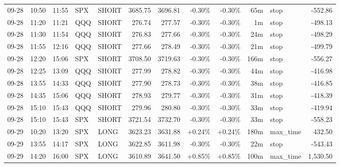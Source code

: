 \documentclass[11pt,a4paper,twoside]{article}
\begin{document}
\begin{center}
\begin{longtable}{>{\color{txtmain}}l l l l l r r r r r >{\color{txtmain}}l r}
09-28 & 10:50 & 11:55 & SPX & SHORT & 3685.75 & 3696.81 & \textcolor{lossred}{-0.30\%} & \textcolor{lossred}{-0.30\%} & 65m & stop & \textcolor{lossred}{-552.86} \\
09-28 & 11:20 & 11:21 & QQQ & SHORT & 276.74 & 277.57 & \textcolor{lossred}{-0.30\%} & \textcolor{lossred}{-0.30\%} & 1m & stop & \textcolor{lossred}{-498.13} \\
09-28 & 11:30 & 11:54 & QQQ & SHORT & 276.83 & 277.66 & \textcolor{lossred}{-0.30\%} & \textcolor{lossred}{-0.30\%} & 24m & stop & \textcolor{lossred}{-498.29} \\
09-28 & 11:55 & 12:16 & QQQ & SHORT & 277.66 & 278.49 & \textcolor{lossred}{-0.30\%} & \textcolor{lossred}{-0.30\%} & 21m & stop & \textcolor{lossred}{-499.79} \\
09-28 & 12:20 & 15:06 & SPX & SHORT & 3708.50 & 3719.63 & \textcolor{lossred}{-0.30\%} & \textcolor{lossred}{-0.30\%} & 166m & stop & \textcolor{lossred}{-556.27} \\
09-28 & 12:25 & 13:09 & QQQ & SHORT & 277.99 & 278.82 & \textcolor{lossred}{-0.30\%} & \textcolor{lossred}{-0.30\%} & 44m & stop & \textcolor{lossred}{-416.98} \\
09-28 & 13:55 & 14:33 & QQQ & SHORT & 277.90 & 278.73 & \textcolor{lossred}{-0.30\%} & \textcolor{lossred}{-0.30\%} & 38m & stop & \textcolor{lossred}{-416.85} \\
09-28 & 14:35 & 15:06 & QQQ & SHORT & 278.93 & 279.77 & \textcolor{lossred}{-0.30\%} & \textcolor{lossred}{-0.30\%} & 31m & stop & \textcolor{lossred}{-418.39} \\
09-28 & 15:10 & 15:43 & QQQ & SHORT & 279.96 & 280.80 & \textcolor{lossred}{-0.30\%} & \textcolor{lossred}{-0.30\%} & 33m & stop & \textcolor{lossred}{-419.94} \\
09-28 & 15:10 & 15:43 & SPX & SHORT & 3721.54 & 3732.70 & \textcolor{lossred}{-0.30\%} & \textcolor{lossred}{-0.30\%} & 33m & stop & \textcolor{lossred}{-558.23} \\
09-29 & 10:20 & 13:20 & SPX & LONG & 3623.23 & 3631.88 & \textcolor{wingreen}{+0.24\%} & \textcolor{wingreen}{+0.24\%} & 180m & max\_time & \textcolor{wingreen}{432.50} \\
09-29 & 13:55 & 14:17 & SPX & LONG & 3622.85 & 3611.98 & \textcolor{lossred}{-0.30\%} & \textcolor{lossred}{-0.30\%} & 22m & stop & \textcolor{lossred}{-543.43} \\
09-29 & 14:20 & 16:00 & SPX & LONG & 3610.89 & 3641.50 & \textcolor{wingreen}{+0.85\%} & \textcolor{wingreen}{+0.85\%} & 100m & max\_time & \textcolor{wingreen}{1,530.50} \\

\end{longtable}
\end{center}
\end{document}
